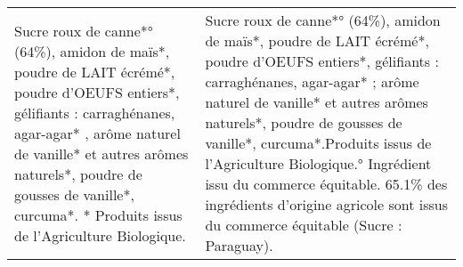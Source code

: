 \begin{tabular}{p{7cm}p{7cm}}
                                                                                                                                                                                                                                                                                                                                                                                                                                                                                                                                                                                                                                                                                                                                                                                                                                                                                                                                                                                                                                                                                                                                                                                                                                                                                                                                                                                                                                 Sucre roux de canne*°(64\%), amidon de maïs*, poudre de LAIT écrémé*, poudre d'OEUFS entiers*, gélifiants : carraghénanes, agar-agar* , arôme naturel de vanille* et autres arômes naturels*, poudre de gousses de vanille*, curcuma*. * Produits issus de l'Agriculture Biologique. &                                                                                                                                Sucre roux de canne*° (64\%), amidon de maïs*, poudre de LAIT écrémé*, poudre d'OEUFS entiers*, gélifiants : carraghénanes, agar-agar* ; arôme naturel de vanille* et autres arômes naturels*, poudre de gousses de vanille*, curcuma*.\newline* Produits issus de l'Agriculture Biologique.\newline° Ingrédient issu du commerce équitable. 65.1\% des ingrédients d'origine agricole sont issus du commerce équitable (Sucre : Paraguay). \\

\end{tabular}
